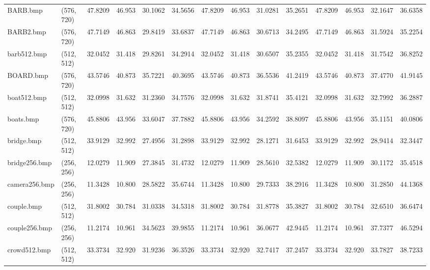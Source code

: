 \documentclass{article}
\begin{document}
\begin{table}[H]
\begin{adjustbox}{center}
\begin{tabular}{llrrrrrrrrrrrr}
          BARB.bmp &  (576, 720) &   47.8209 &    46.953 &   30.1062 &   34.5656 &   47.8209 &    46.953 &   31.0281 &   35.2651 &   47.8209 &    46.953 &   32.1647 &   36.6358 \\
         BARB2.bmp &  (576, 720) &   47.7149 &    46.863 &   29.8419 &   33.6837 &   47.7149 &    46.863 &   30.6713 &   34.2495 &   47.7149 &    46.863 &   31.5924 &   35.2254 \\
       barb512.bmp &  (512, 512) &   32.0452 &    31.418 &   29.8261 &   34.2914 &   32.0452 &    31.418 &   30.6507 &   35.2355 &   32.0452 &    31.418 &   31.7542 &   36.8252 \\
         BOARD.bmp &  (576, 720) &   43.5746 &    40.873 &   35.7221 &   40.3695 &   43.5746 &    40.873 &   36.5536 &   41.2419 &   43.5746 &    40.873 &   37.4770 &   41.9145 \\
       boat512.bmp &  (512, 512) &   32.0998 &    31.632 &   31.2360 &   34.7576 &   32.0998 &    31.632 &   31.8741 &   35.4121 &   32.0998 &    31.632 &   32.7992 &   36.2887 \\
         boats.bmp &  (576, 720) &   45.8806 &    43.956 &   33.6047 &   37.7882 &   45.8806 &    43.956 &   34.2592 &   38.8097 &   45.8806 &    43.956 &   35.1151 &   40.0806 \\
        bridge.bmp &  (512, 512) &   33.9129 &    32.992 &   27.4956 &   31.2898 &   33.9129 &    32.992 &   28.1271 &   31.6453 &   33.9129 &    32.992 &   28.9414 &   32.3447 \\
     bridge256.bmp &  (256, 256) &   12.0279 &    11.909 &   27.3845 &   31.4732 &   12.0279 &    11.909 &   28.5610 &   32.5382 &   12.0279 &    11.909 &   30.1172 &   35.4518 \\
     camera256.bmp &  (256, 256) &   11.3428 &    10.800 &   28.5822 &   35.6744 &   11.3428 &    10.800 &   29.7333 &   38.2916 &   11.3428 &    10.800 &   31.2850 &   44.1368 \\
        couple.bmp &  (512, 512) &   31.8002 &    30.784 &   31.0338 &   34.5318 &   31.8002 &    30.784 &   31.8778 &   35.3827 &   31.8002 &    30.784 &   32.6510 &   36.6474 \\
     couple256.bmp &  (256, 256) &   11.2174 &    10.961 &   34.5623 &   39.9855 &   11.2174 &    10.961 &   36.0677 &   42.9445 &   11.2174 &    10.961 &   37.7377 &   46.5294 \\
      crowd512.bmp &  (512, 512) &   33.3734 &    32.920 &   31.9236 &   36.3526 &   33.3734 &    32.920 &   32.7417 &   37.2457 &   33.3734 &    32.920 &   33.7827 &   38.7233 \\

\end{tabular}
\end{adjustbox}
\end{table}
\end{document}
